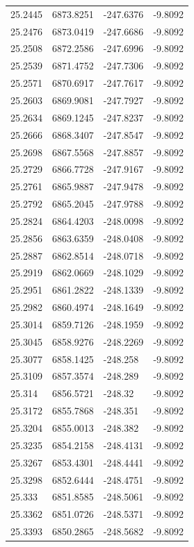 \begin{table}[H]
\begin{tabular}{llll}
25.2445 & 6873.8251 & -247.6376 & -9.8092 \\
25.2476 & 6873.0419 & -247.6686 & -9.8092 \\
25.2508 & 6872.2586 & -247.6996 & -9.8092 \\
25.2539 & 6871.4752 & -247.7306 & -9.8092 \\
25.2571 & 6870.6917 & -247.7617 & -9.8092 \\
25.2603 & 6869.9081 & -247.7927 & -9.8092 \\
25.2634 & 6869.1245 & -247.8237 & -9.8092 \\
25.2666 & 6868.3407 & -247.8547 & -9.8092 \\
25.2698 & 6867.5568 & -247.8857 & -9.8092 \\
25.2729 & 6866.7728 & -247.9167 & -9.8092 \\
25.2761 & 6865.9887 & -247.9478 & -9.8092 \\
25.2792 & 6865.2045 & -247.9788 & -9.8092 \\
25.2824 & 6864.4203 & -248.0098 & -9.8092 \\
25.2856 & 6863.6359 & -248.0408 & -9.8092 \\
25.2887 & 6862.8514 & -248.0718 & -9.8092 \\
25.2919 & 6862.0669 & -248.1029 & -9.8092 \\
25.2951 & 6861.2822 & -248.1339 & -9.8092 \\
25.2982 & 6860.4974 & -248.1649 & -9.8092 \\
25.3014 & 6859.7126 & -248.1959 & -9.8092 \\
25.3045 & 6858.9276 & -248.2269 & -9.8092 \\
25.3077 & 6858.1425 & -248.258 & -9.8092 \\
25.3109 & 6857.3574 & -248.289 & -9.8092 \\
25.314 & 6856.5721 & -248.32 & -9.8092 \\
25.3172 & 6855.7868 & -248.351 & -9.8092 \\
25.3204 & 6855.0013 & -248.382 & -9.8092 \\
25.3235 & 6854.2158 & -248.4131 & -9.8092 \\
25.3267 & 6853.4301 & -248.4441 & -9.8092 \\
25.3298 & 6852.6444 & -248.4751 & -9.8092 \\
25.333 & 6851.8585 & -248.5061 & -9.8092 \\
25.3362 & 6851.0726 & -248.5371 & -9.8092 \\
25.3393 & 6850.2865 & -248.5682 & -9.8092 \\

\end{tabular}
\end{table}
